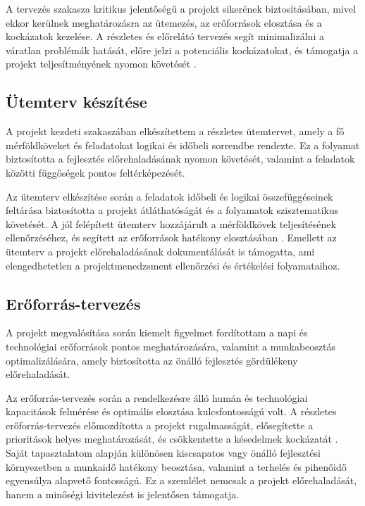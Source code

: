 A tervezés szakasza kritikus jelentőségű a projekt sikerének biztosításában, mivel ekkor kerülnek meghatározásra az ütemezés, az erőforrások elosztása és a kockázatok kezelése. 
A részletes és előrelátó tervezés segít minimalizálni a váratlan problémák hatását, előre jelzi a potenciális kockázatokat, 
és támogatja a projekt teljesítményének nyomon követését \cite{Hajdu2014,Szalay2018,Kovacs2016,Kaposi2019}.

\subsection{Ütemterv készítése}

A projekt kezdeti szakaszában elkészítettem a részletes ütemtervet, amely a fő mérföldköveket és feladatokat logikai és időbeli sorrendbe rendezte.  
Ez a folyamat biztosította a fejlesztés előrehaladásának nyomon követését, valamint a feladatok közötti függőségek pontos feltérképezését.  

Az ütemterv elkészítése során a feladatok időbeli és logikai összefüggéseinek feltárása biztosította a projekt átláthatóságát és a folyamatok szisztematikus követését.  
A jól felépített ütemterv hozzájárult a mérföldkövek teljesítésének ellenőrzéséhez,  
és segített az erőforrások hatékony elosztásában \cite{Kovacs2016,Kaposi2019}.  
Emellett az ütemterv a projekt előrehaladásának dokumentálását is támogatta,  
ami elengedhetetlen a projektmenedzsment ellenőrzési és értékelési folyamataihoz.

\subsection{Erőforrás-tervezés}

A projekt megvalósítása során kiemelt figyelmet fordítottam a napi és technológiai erőforrások pontos meghatározására, valamint a munkabeosztás optimalizálására, 
amely biztosította az önálló fejlesztés gördülékeny előrehaladását.  

Az erőforrás-tervezés során a rendelkezésre álló humán és technológiai kapacitások felmérése és optimális elosztása kulcsfontosságú volt.  
A részletes erőforrás-tervezés előmozdította a projekt rugalmasságát, elősegítette a prioritások helyes meghatározását, és csökkentette a késedelmek kockázatát \cite{Hajdu2014,Szalay2018}.  
Saját tapasztalatom alapján különösen kiscsapatos vagy önálló fejlesztési környezetben a munkaidő hatékony beosztása, valamint a terhelés és pihenőidő egyensúlya alapvető fontosságú.  
Ez a szemlélet nemcsak a projekt előrehaladását, hanem a minőségi kivitelezést is jelentősen támogatja.

